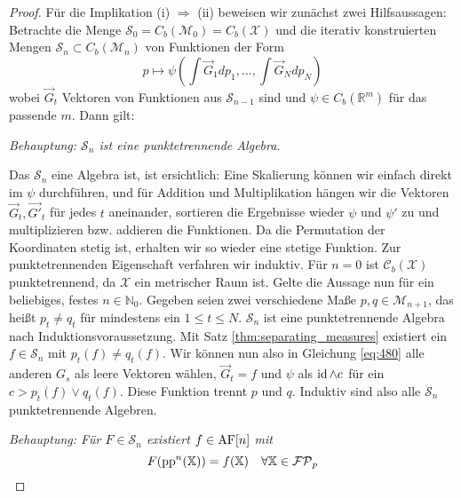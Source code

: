 \begin{proof}
        Für die Implikation (i) $\Rightarrow$ (ii) beweisen wir zunächst zwei Hilfsaussagen: Betrachte die Menge $\mathcal{S}_0= C_b(\mathcal{M}_0) = C_b(\mathcal{X})$ und die iterativ konstruierten Mengen $\mathcal{S}_n \subset C_b(\mathcal{M}_n)$ von Funktionen der Form
        \begin{equation}\label{eq:480}
            p \mapsto \psi\left( \int \vec{G}_1dp_1, ..., \int \vec{G}_N dp_N\right)
        \end{equation}
        wobei $\vec{G}_t$ Vektoren von Funktionen aus $\mathcal{S}_{n-1}$ sind und $\psi \in C_b(\mathbb{R}^m)$ für das passende $m$. Dann gilt: 

        \emph{Behauptung: $\mathcal{S}_n$ ist eine punktetrennende Algebra.}

        Das $\mathcal{S}_n$ eine Algebra ist, ist ersichtlich: Eine Skalierung können wir einfach direkt im $\psi$ durchführen, und für Addition und Multiplikation hängen wir die Vektoren $\vec{G}_t, \vec{G'}_t$ für jedes $t$ aneinander, sortieren die Ergebnisse wieder $\psi$ und $\psi'$ zu und multiplizieren bzw. addieren die Funktionen. Da die Permutation der Koordinaten stetig ist, erhalten wir so wieder eine stetige Funktion. Zur punktetrennenden Eigenschaft verfahren wir induktiv. Für $n=0$ ist $\mathcal{C}_b(\mathcal{X})$ punktetrennend, da $\mathcal{X}$ ein metrischer Raum ist. Gelte die Aussage nun für ein beliebiges, festes $n \in \mathbb{N}_0$. Gegeben seien zwei verschiedene Maße $p,q \in \mathcal{M}_{n+1}$, das heißt $p_t\neq q_t$ für mindestens ein $1\leq t\leq N$. $\mathcal{S}_{n}$ ist eine punktetrennende Algebra nach Induktionsvoraussetzung. Mit Satz \ref{thm:separating_measures} existiert ein $f \in \mathcal{S}_{n}$ mit $p_t(f) \neq q_t(f)$. Wir können nun also in Gleichung \ref{eq:480} alle anderen $G_s$ als leere Vektoren wählen, $\vec{G}_t = f$ und $\psi$ als $\operatorname{id} \wedge c$ für ein $c > p_t(f)\vee q_t(f)$. Diese Funktion trennt $p$ und $q$. Induktiv sind also alle $\mathcal{S}_n$ punktetrennende Algebren.

        \emph{Behauptung: Für $F\in \mathcal{S}_n$ existiert $f \in \operatorname{AF}[n]$ mit 
        $$F(\operatorname{pp}^n(\mathbb{X})) = f(\mathbb{X}) \quad \forall \mathbb{X} \in \mathcal{FP}_p$$}


\end{proof}
